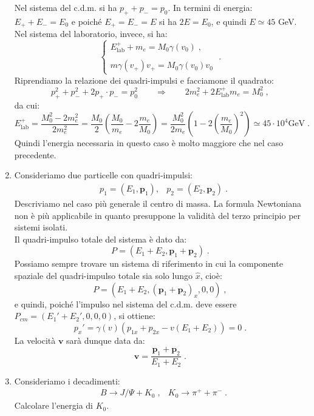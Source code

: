 \begin{enumerate}
Nel sistema del c.d.m. si ha $p_++p_-=p_0$. In termini di energia: $E_++E_-=E_0$ e poiché $E_+=E_-=E$ si ha $2E=E_0$, e quindi $E\simeq
45$ GeV. Nel sistema del laboratorio, invece, si ha:
\begin{equation}
\begin{cases}
E^+_{\mathrm{lab}}+m_e=M_0\gamma(v_0)\;, \\
\\
m\gamma(v_+)v_+=M_0\gamma(v_0)v_0
\end{cases}\;.
\end{equation}
Riprendiamo la relazione dei quadri-impulsi e facciamone il quadrato:
\begin{equation}
p_+^2+p_-^2+2p_+\cdot p_-=p_0^2\qquad \Longrightarrow\qquad 2m_e^2+2E^+_{\mathrm{lab}}m_e=M_0^2\;,
\end{equation}
da cui:
\begin{equation}
E^+_{\mathrm{lab}}=\frac{M_0^2-2m_e^2}{2m_e^2}=\frac{M_0}{2}\left(\frac{M_0}{m_e}-2\frac{m_e}{M_0}\right)=\frac{M_0^2}{2m_e}\left(1-2\left(\frac{m_e}{M_0}\right)^2\right) \simeq 45\cdot 10^4 \mbox{GeV}\;.
\end{equation}
Quindi l'energia necessaria in questo caso è molto maggiore che nel caso precedente.
\item Consideriamo due particelle con quadri-impulsi:
 \begin{align}
&p_1=(E_1,\mathbf{p}_1), &p_2=(E_2,\mathbf{p}_2)\;.
 \end{align}
Descriviamo nel caso più generale il centro di massa. La formula Newtoniana non è più applicabile in quanto presuppone la validità del 
terzo principio per sistemi isolati. \\

Il quadri-impulso totale del sistema è dato da:
\begin{equation}
P=(E_1+E_2,\mathbf{p}_1+\mathbf{p}_2)\;.
\end{equation}
Possiamo sempre trovare un sistema di riferimento in cui la componente spaziale del quadri-impulso totale sia solo lungo $\hat{x}$, cioè:
\begin{equation}
P=(E_1+E_2,(\mathbf{p}_1+\mathbf{p}_2)_x,0,0)\;,
\end{equation}
e quindi, poiché l'impulso nel sistema del c.d.m. deve essere $P_{cm}=(E_1'+E_2',0,0,0)$, si ottiene:
\begin{equation}
p_x'=\gamma(v)\left(p_{1x}+p_{2x}-v(E_1+E_2)\right)=0\;.
\end{equation}
La velocità $\mathbf{v}$ sarà dunque data da:
\begin{equation}
\mathbf{v}=\frac{\mathbf{p}_1+\mathbf{p}_2}{E_1+E_2}\;.
\end{equation}
\item Consideriamo i decadimenti:
 \begin{align}
&B\to J/\Psi + K_0\;, &K_0\to \pi^++\pi^-\;.
 \end{align}
Calcolare l'energia di $K_0$. \\


\end{enumerate}
